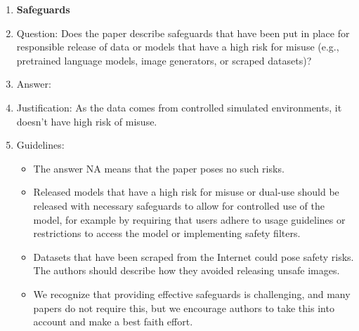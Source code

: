 \documentclass{article}
\begin{document}
\begin{enumerate}
\item {\bf Safeguards}
    \item[] Question: Does the paper describe safeguards that have been put in place for responsible release of data or models that have a high risk for misuse (e.g., pretrained language models, image generators, or scraped datasets)?
    \item[] Answer: \answerNA{} %
    \item[] Justification: As the data comes from controlled simulated environments, it doesn't have high risk of misuse.
    \item[] Guidelines:
    \begin{itemize}
        \item The answer NA means that the paper poses no such risks.
        \item Released models that have a high risk for misuse or dual-use should be released with necessary safeguards to allow for controlled use of the model, for example by requiring that users adhere to usage guidelines or restrictions to access the model or implementing safety filters. 
        \item Datasets that have been scraped from the Internet could pose safety risks. The authors should describe how they avoided releasing unsafe images.
        \item We recognize that providing effective safeguards is challenging, and many papers do not require this, but we encourage authors to take this into account and make a best faith effort.
    \end{itemize}


\end{enumerate}
\end{document}
